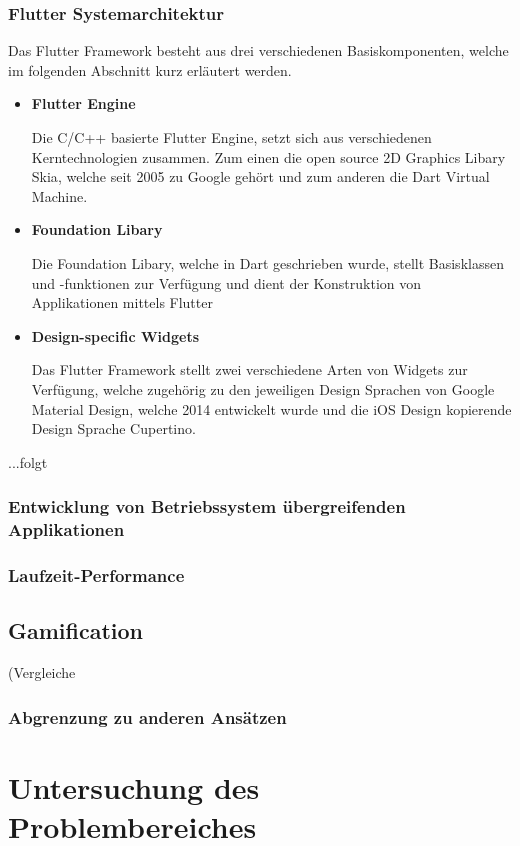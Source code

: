 \documentclass{scrreprt}
\begin{document}
\subsection{Flutter Systemarchitektur} 
Das Flutter Framework besteht aus drei verschiedenen Basiskomponenten, welche im folgenden Abschnitt kurz erläutert werden.
\begin{itemize}
\item{\textbf{Flutter Engine}}

Die C/C++ basierte Flutter Engine, setzt sich aus verschiedenen Kerntechnologien zusammen. Zum einen die open source 2D Graphics Libary Skia\cite{Skia1}, welche seit 2005 zu Google gehört und zum anderen die Dart Virtual Machine.
\item{\textbf{Foundation Libary}}

Die Foundation Libary, welche in Dart geschrieben wurde, stellt Basisklassen und -funktionen zur Verfügung und dient der Konstruktion von Applikationen mittels Flutter
\item{\textbf{Design-specific Widgets}}

Das Flutter Framework stellt zwei verschiedene Arten von Widgets zur Verfügung, welche zugehörig zu den jeweiligen Design Sprachen von Google Material Design\cite{Mat1}, welche 2014 entwickelt wurde und die iOS Design kopierende Design Sprache Cupertino\cite{Cup1}.
\end{itemize}

		...folgt

\subsection{Entwicklung von Betriebssystem übergreifenden Applikationen}

\subsection{Laufzeit-Performance}

\section{Gamification}
(Vergleiche \cite{Strahringer2017}
\subsection{Abgrenzung zu anderen Ansätzen}


\chapter{Untersuchung des Problembereiches} \label{chap:problemanalyse}
\end{document}
